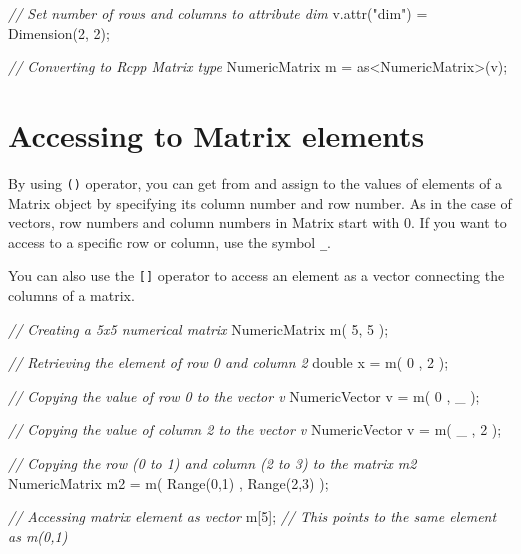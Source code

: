 \documentclass[]{book}
\newenvironment{Shaded}{\begin{snugshade}}{\end{snugshade}}
\newcommand{\CommentTok}[1]{\textcolor[rgb]{0.56,0.35,0.01}{\textit{#1}}}
\newcommand{\DataTypeTok}[1]{\textcolor[rgb]{0.13,0.29,0.53}{#1}}
\newcommand{\DecValTok}[1]{\textcolor[rgb]{0.00,0.00,0.81}{#1}}
\newcommand{\NormalTok}[1]{#1}
\newcommand{\StringTok}[1]{\textcolor[rgb]{0.31,0.60,0.02}{#1}}
\begin{document}
\begin{Shaded}
\begin{Highlighting}[]
\CommentTok{// Set number of rows and columns to attribute dim}
\NormalTok{v.attr(}\StringTok{"dim"}\NormalTok{) = Dimension(}\DecValTok{2}\NormalTok{, }\DecValTok{2}\NormalTok{);}

\CommentTok{// Converting to Rcpp Matrix type}
\NormalTok{NumericMatrix m = as<NumericMatrix>(v);}
\end{Highlighting}
\end{Shaded}

\hypertarget{accessing-to-matrix-elements}{%
\section{Accessing to Matrix elements}\label{accessing-to-matrix-elements}}

By using \texttt{()} operator, you can get from and assign to the values of elements of a Matrix object by specifying its column number and row number. As in the case of vectors, row numbers and column numbers in Matrix start with 0. If you want to access to a specific row or column, use the symbol \texttt{\_}.

You can also use the \texttt{{[}{]}} operator to access an element as a vector connecting the columns of a matrix.

\begin{Shaded}
\begin{Highlighting}[]
\CommentTok{// Creating a 5x5 numerical matrix}
\NormalTok{NumericMatrix m( }\DecValTok{5}\NormalTok{, }\DecValTok{5}\NormalTok{ );}

\CommentTok{// Retrieving the element of row 0 and column 2}
\DataTypeTok{double}\NormalTok{ x = m( }\DecValTok{0}\NormalTok{ , }\DecValTok{2}\NormalTok{ );}

\CommentTok{// Copying the value of row 0 to the vector v}
\NormalTok{NumericVector v = m( }\DecValTok{0}\NormalTok{ , _ );}

\CommentTok{// Copying the value of column 2 to the vector v}
\NormalTok{NumericVector v = m( _ , }\DecValTok{2}\NormalTok{ );}

\CommentTok{// Copying the row (0 to 1) and column (2 to 3) to the matrix m2}
\NormalTok{NumericMatrix m2 = m( Range(}\DecValTok{0}\NormalTok{,}\DecValTok{1}\NormalTok{) , Range(}\DecValTok{2}\NormalTok{,}\DecValTok{3}\NormalTok{) );}

\CommentTok{// Accessing matrix element as vector}
\NormalTok{m[}\DecValTok{5}\NormalTok{]; }\CommentTok{// This points to the same element as m(0,1)}
\end{Highlighting}
\end{Shaded}
\end{document}
